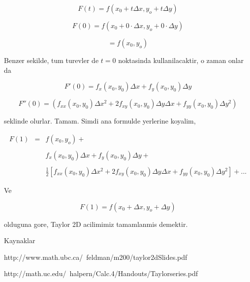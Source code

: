 \documentclass[12pt,fleqn]{article}
\begin{document}
\[ F(t) = f(x_0 + t\Delta x, y_o + t\Delta y) \]

\[ F(0) = f(x_0 + 0 \cdot \Delta x, y_o + 0 \cdot \Delta y) \]

\[ = f(x_0 , y_o) \]

Benzer sekilde, tum turevler de $t=0$ noktasinda kullanilacaktir, o zaman
onlar da

\[ F'(0) = f_x(x_0,y_0) \Delta x + f_y(x_0,y_0) \Delta y \]

\[ F''(0) =  
(f_{xx}(x_0,y_0)\Delta x^2 + 2f_{xy}(x_0,y_0)\Delta y \Delta x + 
f_{yy}(x_0,y_0)\Delta y^2 )
\]

seklinde olurlar. Tamam. Simdi ana formulde yerlerine koyalim,

\[ 
\begin{array}{lll}
F(1) &=& f(x_0 , y_o) +  \\ \\ 
&& f_x(x_0,y_0) \Delta x + f_y(x_0,y_0) \Delta y +   \\ \\
&& \frac{1}{2} 
[ 
f_{xx}(x_0,y_0)\Delta x^2 + 
2f_{xy}(x_0,y_0)\Delta y \Delta x +
f_{yy}(x_0,y_0)\Delta y^2 
] + ... 
\end{array}
 \]


Ve

\[ F(1) = f(x_0 +\Delta x, y_o + \Delta y) \]

olduguna gore, Taylor 2D acilimimiz tamamlanmis demektir. 

Kaynaklar 

http://www.math.ubc.ca/~feldman/m200/taylor2dSlides.pdf

http://math.uc.edu/~halpern/Calc.4/Handouts/Taylorseries.pdf
\end{document}
